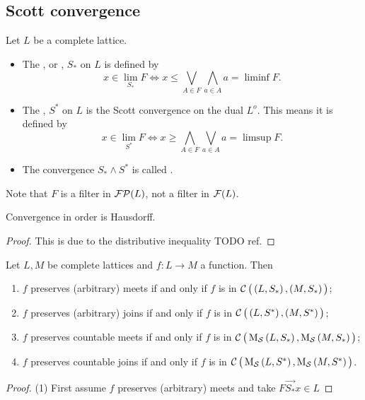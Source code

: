 \subsection{Scott convergence}

\begin{definition}
Let $L$ be a complete lattice.
\begin{itemize}
\item The , or , $S_*$ on $L$ is defined by
\[ x \in \lim_{S_*} F \iff x \leq \bigvee_{A\in F}\bigwedge_{a\in A}a = \liminf F. \]

\item The , $S^*$ on $L$ is the Scott convergence on the dual $L^o$. This means it is defined by
\[ x \in \lim_{S^*} F \iff x \geq \bigwedge_{A\in F}\bigvee_{a\in A}a = \limsup F. \]
\item The convergence $S_* \wedge S^*$ is called .
\end{itemize}
\end{definition}
Note that $F$ is a filter in $\operatorname{\mathcal{FP}}(L)$, not a filter in $\operatorname{\mathcal{F}}(L)$.

\begin{proposition}
Convergence in order is Hausdorff.
\end{proposition}
\begin{proof}
This is due to the distributive inequality TODO ref.
\end{proof}

\begin{proposition}
Let $L, M$ be complete lattices and $f: L\to M$ a function. Then
\begin{enumerate}
\item $f$ preserves (arbitrary) meets \textup{if and only if} $f$ is in $\operatorname{\mathcal{C}}\big(\left( L, S_* \right), \left( M, S_* \right)\big)$;
\item $f$ preserves (arbitrary) joins \textup{if and only if} $f$ is in $\operatorname{\mathcal{C}}\big(\left( L, S^* \right), \left( M, S^* \right)\big)$;
\item $f$ preserves countable meets \textup{if and only if} $f$ is in $\operatorname{\mathcal{C}}\big(\operatorname{M_\mathcal{S}}\left( L, S_* \right), \operatorname{M_\mathcal{S}}\left( M, S_* \right)\big)$;
\item $f$ preserves countable joins \textup{if and only if} $f$ is in $\operatorname{\mathcal{C}}\big(\operatorname{M_\mathcal{S}}\left( L, S^* \right), \operatorname{M_\mathcal{S}}\left( M, S^* \right)\big)$.
\end{enumerate}
\end{proposition}
\begin{proof}
(1) First assume $f$ preserves (arbitrary) meets and take $F\overset{\longrightarrow}{S_*}x\in L$
\end{proof}

